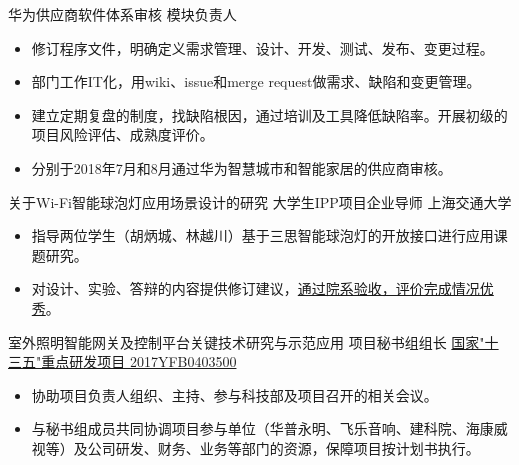 \documentclass[11pt,a4paper]{moderncv/moderncv}
\begin{document}
{华为供应商软件体系审核}
{模块负责人}
{}{}
{
\begin{itemize}
	\item 修订程序文件，明确定义需求管理、设计、开发、测试、发布、变更过程。
	\item 部门工作IT化，用wiki、issue和merge request做需求、缺陷和变更管理。
	\item 建立定期复盘的制度，找缺陷根因，通过培训及工具降低缺陷率。开展初级的项目风险评估、成熟度评价。
	\item 分别于2018年7月和8月通过华为智慧城市和智能家居的供应商审核。
\end{itemize}
}

{关于Wi-Fi智能球泡灯应用场景设计的研究}
{大学生IPP项目企业导师}
{上海交通大学}{}
{
\begin{itemize}
	\item 指导两位学生（胡炳城、林越川）基于三思智能球泡灯的开放接口进行应用课题研究。
	\item 对设计、实验、答辩的内容提供修订建议，\href{https://bingcheng1998.github.io/zh-CN/制作/sansi全彩灯泡的app设计.html}{通过院系验收，评价完成情况优秀}。
\end{itemize}
}

{室外照明智能网关及控制平台关键技术研究与示范应用}
{项目秘书组组长}
{\href{http://service.most.gov.cn/u/cms/static/201706/05145323ywhn.pdf}{国家"十三五"重点研发项目 2017YFB0403500}}{}
{
\begin{itemize}
	\item 协助项目负责人组织、主持、参与科技部及项目召开的相关会议。
	\item 与秘书组成员共同协调项目参与单位（华普永明、飞乐音响、建科院、海康威视等）及公司研发、财务、业务等部门的资源，保障项目按计划书执行。
\end{itemize}
}


\end{document}
